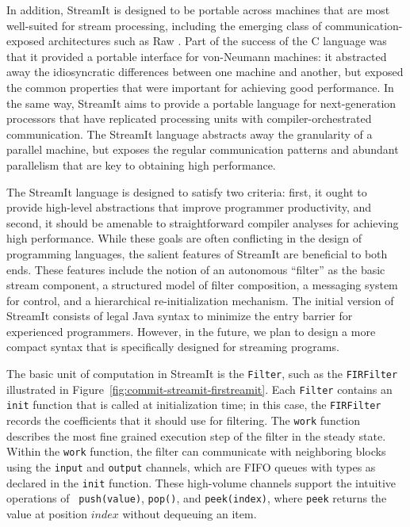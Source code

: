In addition, StreamIt is designed to be portable across machines that
are most well-suited for stream processing, including the emerging
class of communication-exposed architectures such as Raw \cite{rawshort}.
Part of the success of the C language was that it provided a portable
interface for von-Neumann machines: it abstracted away the
idiosyncratic differences between one machine and another, but exposed
the common properties that were important for achieving good
performance.  In the same way, StreamIt aims to provide a portable
language for next-generation processors that have replicated
processing units with compiler-orchestrated communication.  The
StreamIt language abstracts away the granularity of a parallel
machine, but exposes the regular communication patterns and abundant
parallelism that are key to obtaining high performance.

The StreamIt language is designed to satisfy two criteria: first, it
ought to provide high-level abstractions that improve programmer
productivity, and second, it should be amenable to straightforward
compiler analyses for achieving high performance.  While these goals
are often conflicting in the design of programming languages, the
salient features of StreamIt are beneficial to both ends.  These
features include the notion of an autonomous ``filter'' as the basic
stream component, a structured model of filter composition, a
messaging system for control, and a hierarchical re-initialization
mechanism.  The initial version of StreamIt consists of legal Java
syntax to minimize the entry barrier for experienced programmers.
However, in the future, we plan to design a more compact syntax that
is specifically designed for streaming programs.

The basic unit of computation in StreamIt is the {\tt Filter}, such as
the {\tt FIRFilter} illustrated in
Figure~\ref{fig:commit-streamit-firstreamit}.  Each {\tt Filter}
contains an {\tt init} function that is called at initialization time;
in this case, the {\tt FIRFilter} records the coefficients that it
should use for filtering.  The {\tt work} function describes the most
fine grained execution step of the filter in the steady state.  Within
the {\tt work} function, the filter can communicate with neighboring
blocks using the {\tt input} and {\tt output} channels, which are FIFO
queues with types as declared in the {\tt init} function.  These
high-volume channels support the intuitive operations of {\tt
push(value)}, {\tt pop()}, and {\tt peek(index)}, where {\tt peek}
returns the value at position $index$ without dequeuing an item.


